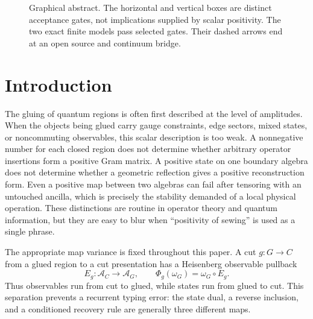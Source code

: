 \documentclass[11pt,a4paper]{article}
\theoremstyle{definition}
\theoremstyle{remark}
\newcommand{\A}{\mathcal A}
\begin{document}
\begin{figure}[H]
{
}
\caption{Graphical abstract.  The horizontal and vertical boxes are distinct
acceptance gates, not implications supplied by scalar positivity.  The two exact
finite models pass selected gates.  Their dashed arrows end at an open source and
continuum bridge.}
\label{fig:graphical-abstract}
\end{figure}

\section{Introduction}

The gluing of quantum regions is often first described at the level of amplitudes.
When the objects being glued carry gauge constraints, edge sectors, mixed states, or
noncommuting observables, this scalar description is too weak.  A nonnegative number
for each closed region does not determine whether arbitrary operator insertions form a
positive Gram matrix.  A positive state on one boundary algebra does not determine
whether a geometric reflection gives a positive reconstruction form.  Even a positive
map between two algebras can fail after tensoring with an untouched ancilla, which is
precisely the stability demanded of a local physical operation.  These distinctions
are routine in operator theory and quantum information, but they are easy to blur when
``positivity of sewing'' is used as a single phrase.

The appropriate map variance is fixed throughout this paper.  A cut
$g:G\rightarrow C$ from a glued region to a cut presentation has a Heisenberg
observable pullback
\begin{equation}
  E_g:\A_C\longrightarrow\A_G,
  \qquad
  \Phi_g(\omega_G)=\omega_G\circ E_g .
  \label{eq:variance}
\end{equation}
Thus observables run from cut to glued, while states run from glued to cut.  This
separation prevents a recurrent typing error: the state dual, a reverse inclusion, and
a conditioned recovery rule are generally three different maps.
\end{document}
